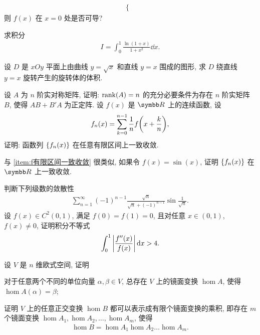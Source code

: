 \documentclass{ctexart}
\begin{document}
\begin{exercise}[resume=exer]
\begin{align*}
\begin{cases}
            \end{cases}
        \end{align*}
        则 $ f(x) $ 在 $ x = 0 $ 处是否可导?
        \item 求积分
        \begin{align*}
            I = \int_{0}^{1} \frac{\ln(1 + x)}{1 + x^{2}} \dd{x}.
        \end{align*}
        \item 设 $ D $ 是 $ xOy $ 平面上由曲线 $ y = \sqrt{x} $ 和直线 $ y = x $ 围成的图形, 求 $ D $ 绕直线 $ y = x $ 旋转产生的旋转体的体积.
        \item 设 $ A $ 为 $ n $ 阶实对称矩阵, 证明: $ \rank(A) = n $ 的充分必要条件为存在 $ n $ 阶实矩阵 $ B $, 使得 $ AB + B'A $ 为正定阵.
        \sitem\label{item:f有限区间一致收敛} 设 $ f(x) $ 是 $ \R $ 上的连续函数, 设
        \begin{align*}
            f_{n}(x) = \sum_{k=0}^{n-1}\frac{1}{n}f\qty(x+\frac{k}{n}),
        \end{align*} 
        证明: 函数列 $ \qty{f_{n}(x)} $ 在任意有限区间上一致收敛. 
        \item 与 \ref{item:f有限区间一致收敛} 很类似, 如果令 $ f(x) = \sin(x) $, 证明 $ \qty{f_{n}(x)} $ 在 $ \R $ 上一致收敛. 
        \item 判断下列级数的敛散性
        \begin{align*}
            \sum_{n = 1}^{\infty} (-1)^{n - 1} \frac{\sqrt{n}}{\sqrt{n} + (-1)^{n-1}}\sin\frac{1}{\sqrt{n}}.
        \end{align*}
        \sitem 设 $ f(x) \in C^{2}(0, 1) $, 满足 $ f(0) = f(1) = 0 $, 且对任意 $ x\in (0, 1) $, $ f(x) \ne 0 $, 证明积分不等式
        \begin{align*}
            \int_{0}^{1} \abs{\frac{f''(x)}{f(x)}} \dd{x} > 4.
        \end{align*}
        \item 设 $ V $ 是 $ n $ 维欧式空间, 证明
        \begin{exercise}
            \item 对于任意两个不同的单位向量 $ \alpha, \beta \in V $, 总存在 $ V $ 上的镜面变换 $ \hom{A} $, 使得 $ \hom{A}(\alpha) = \beta $;
            \item 证明 $ V $ 上的任意正交变换 $ \hom{B} $ 都可以表示成有限个镜面变换的乘积, 即存在 $ m $ 个镜面变换 $ \hom{A}_{1}, \hom{A}_{2}, \dots, \hom{A}_{m} $, 使得
            \begin{align*}
                \hom{B} = \hom{A}_{1}\hom{A}_{2}\dots\hom{A}_{m}.

\end{align*}
\end{exercise}
\end{exercise}
\end{document}
